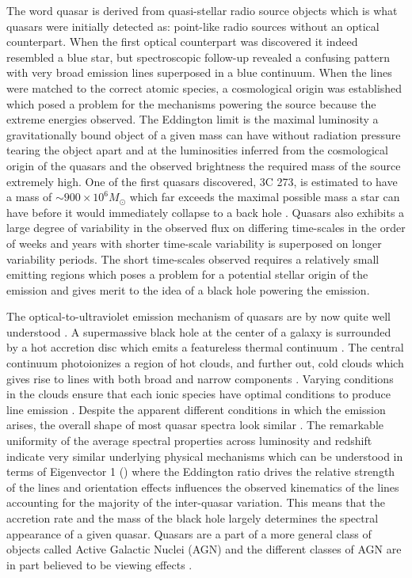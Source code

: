 The word quasar is derived from quasi-stellar radio source objects which is what quasars were initially detected as: point-like radio sources without an optical counterpart. When the first optical counterpart was discovered it indeed resembled a blue star, but spectroscopic follow-up revealed a confusing pattern with very broad emission lines superposed in a blue continuum. When the lines were matched to the correct atomic species, a cosmological origin was established which posed a problem for the mechanisms powering the source because the extreme energies observed. The Eddington limit is the maximal luminosity a gravitationally bound object of a given mass can have without radiation pressure tearing the object apart and at the luminosities inferred from the cosmological origin of the quasars and the observed brightness the required mass of the source extremely high. One of the first quasars discovered, 3C 273, is estimated to have a mass of $\sim900 \times 10^{6} M_\odot$ \citep{Peterson2004} which far exceeds the maximal possible mass a star can have before it would immediately collapse to a back hole \citep{Belczynski2010}. Quasars also exhibits a large degree of variability in the observed flux on differing time-scales in the order of weeks and years with shorter time-scale variability is superposed on longer variability periods. The short time-scales observed requires a relatively small emitting regions which poses a problem for a potential stellar origin of the emission and gives merit to the idea of a black hole powering the emission.

The optical-to-ultraviolet emission mechanism of quasars are by now quite well understood \citep{Elvis1994}. A supermassive black hole at the center of a galaxy is surrounded by a hot accretion disc which emits a featureless thermal continuum \citep{Shakura1973, Pereyra2006}. The central continuum photoionizes a region of hot clouds, and further out, cold clouds which gives rise to lines with both broad and narrow components \citep{Elvis2001}.  Varying conditions in the clouds ensure that each ionic species have optimal conditions to produce line emission \citep{Baldwin1995}. Despite the apparent different conditions in which the emission arises, the overall shape of most quasar spectra look similar \citep{Dietrich2002}. The remarkable uniformity of the average spectral properties across luminosity and redshift indicate very similar underlying physical mechanisms which can be understood in terms of Eigenvector 1 (\citep{Boroson1992, Francis1992}) where the Eddington ratio drives the relative strength of the lines and orientation effects influences the observed kinematics of the lines \citep{Shen2014a} accounting for the majority of the inter-quasar variation. This means that the accretion rate and the mass of the black hole largely determines the spectral appearance of a given quasar. Quasars are a part of a more general class of objects called Active Galactic Nuclei (AGN) and the different classes of AGN are in part believed to be viewing effects \citep{Elvis2001}.


